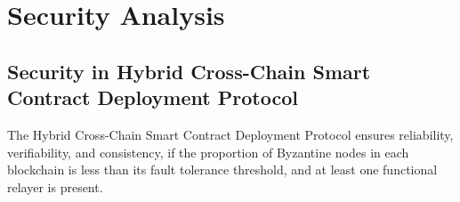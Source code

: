 \section{Security Analysis}\label{security_analysis}

\subsection{Security in Hybrid Cross-Chain Smart Contract Deployment Protocol}

\begin{theorem}
The Hybrid Cross-Chain Smart Contract Deployment Protocol ensures reliability, verifiability, and consistency, if the proportion of Byzantine nodes in each blockchain is less than its fault tolerance threshold, and at least one functional relayer is present.
\end{theorem}

